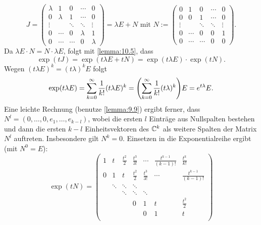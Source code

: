 \begin{anwendung}
	\[
		J = \begin{pmatrix}
		\lambda & 1 & 0 & \cdots & 0 \\ 
		0 & \lambda & 1 & \cdots & 0 \\ 
		\vdots &  & \ddots & \ddots & \vdots \\ 
		0 & \cdots & 0 & \lambda & 1 \\ 
		0 & \cdots & \cdots & 0 & \lambda
		\end{pmatrix} = \lambda E + N \text{ mit } N:= \begin{pmatrix}
		0 & 1 & 0 & \cdots & 0 \\ 
		0 & 0 & 1 & \cdots & 0 \\ 
		\vdots &  & \ddots & \ddots & \vdots \\ 
		0 & \cdots & 0 & 0 & 1 \\ 
		0 & \cdots & \cdots & 0 & 0
		\end{pmatrix}.
	\]
	Da $\lambda E \cdot N = N \cdot \lambda E$, folgt mit \autoref{lemma:10.5}, dass
	\[
		\exp(tJ) = \exp(t\lambda E + tN) = \exp(t \lambda E) \cdot \exp(tN).
	\]
	Wegen $(t\lambda E)^{k} = (t\lambda)^{k}E$ folgt
	\[
		\exp(t\lambda E) = \sum_{k=0}^{\infty} \frac{1}{k!} (t \lambda E)^{k} = \enb{\sum_{k=0}^{\infty} \frac{1}{k!} (t\lambda)^{k}} E = e^{t\lambda} E.
	\]
	Eine leichte Rechnung (benutze \autoref{lemma:9.9}) ergibt ferner, dass $N^{l} = (0, \dots, 0,e_1,\dots,e_{k-l})$, wobei die ersten $l$ Einträge aus Nullspalten bestehen und dann die ersten $k-l$ Einheitsvektoren des $\mathbb{C}^{k}$ als weitere Spalten der Matrix $N^{l}$ auftreten.
	Insbesondere gilt $N^{k} = 0$.
	Einsetzen in die Exponentialreihe ergibt (mit $N^0 = E$):
	\[
		\exp(tN) =
		\begin{pmatrix}
			1 & t      & \frac{t^2}{2} & \frac{t^3}{3!} & \cdots         & \frac{t^{k-1}}{(k-1)!} & \frac{t^{k}}{k!}       \\
			0 & 1      & t             & \frac{t^2}{2}  & \frac{t^3}{3!} & \cdots                 & \frac{t^{k-1}}{(k-1)!} \\
			  & \ddots & \ddots        & \ddots         &                &                        &  \\
			  &        & \ddots        & \ddots         & \ddots         &                        &  \\
			  &        &               & 0              & 1              & t                      & \frac{t^2}{2}          \\
			  &        &               &                & 0              & 1                      & t                      \\

\end{pmatrix}\]
\end{anwendung}
